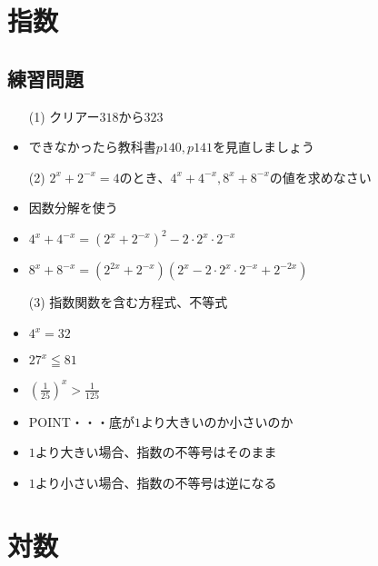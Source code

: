 \documentclass[12pt]{jarticle}
\begin{document}
\section{指数}
\subsection{練習問題}
\begin{itemize}
  \item [(1)]クリアー$318$から$323$
  \item できなかったら教科書$p140,p141$を見直しましょう
  \item [(2)]$\displaystyle 2^x + 2^{-x} = 4のとき、4^x + 4^{-x},8^x + 8^{-x}$の値を求めなさい
  \item 因数分解を使う
  \item $\displaystyle 4^x + 4^{-x} = (2^x + 2^{-x})^2 - 2\cdot 2^x \cdot 2^{-x}$
  \item $\displaystyle 8^x + 8^{-x} = (2^{2x} + 2^{-x})(2^x - 2\cdot 2^{x} \cdot 2^{-x} +  2^{-2x})$
  \item [(3)]指数関数を含む方程式、不等式
  \item $\displaystyle 4^x = 32$
  \item $\displaystyle 27^x \leqq 81$
  \item $\displaystyle (\frac{1}{25})^x > \frac{1}{125}$
  \item POINT・・・底が$1$より大きいのか小さいのか
  \item $1$より大きい場合、指数の不等号はそのまま
  \item $1$より小さい場合、指数の不等号は逆になる
\end{itemize}
\section{対数}
\end{document}
